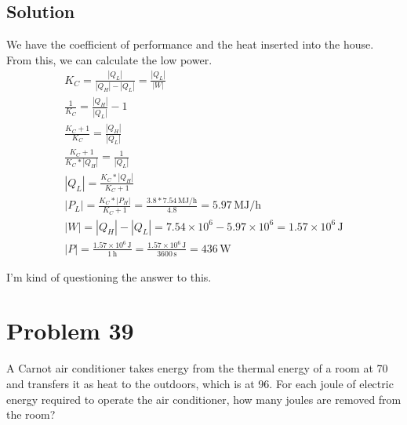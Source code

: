 \documentclass[12pt]{article}
\newcommand{\E}[1]{\times 10^{#1}}
\begin{document}
        \subsection{Solution}
            We have the coefficient of performance and the heat inserted into the house.
            From this, we can calculate the low power.
            \begin{gather}
                K_C =   \frac{| Q_L |}{| Q_H | - | Q_L |}
                    =   \frac{| Q_L |}{| W |}\\
                \frac{1}{K_C}   =   \frac{| Q_H |}{| Q_L |} - 1\\
                \frac{K_C + 1}{K_C} =   \frac{| Q_H |}{| Q_L |}\\
                \frac{K_C + 1}{K_C * | Q_H |} =   \frac{1}{| Q_L |}\\
                | Q_L | =   \frac{K_C * | Q_H |}{K_C + 1}\\
                | P_L | =   \frac{K_C * | P_H |}{K_C + 1}
                    =   \frac{3.8 * 7.54\,\unit{\mega\joule/\hour}}{4.8}
                    =   5.97\,\unit{\mega\joule/\hour}\\
                |W| =   |Q_H| - |Q_L|
                    =   7.54\E{6} - 5.97\E{6}
                    =   1.57\E{6}\,\unit{\joule}\\
                |P| =   \frac{1.57\E{6}\,\unit{\joule}}{1\,\unit{\hour}}
                    =   \frac{1.57\E{6}\,\unit{\joule}}{3600\,\unit{\second}}
                    =   \boxed{436\,\unit{\watt}}
            \end{gather}

            I'm kind of questioning the answer to this. 

    \pagebreak
    \section{Problem 39}
        A Carnot air conditioner takes energy from the thermal energy of a room at 70\unit{\fahrenheit} and transfers it as heat to the outdoors, which is at 96\unit{\fahrenheit}. 
        For each joule of electric energy required to operate the air conditioner, how many joules are removed from the room?
\end{document}
